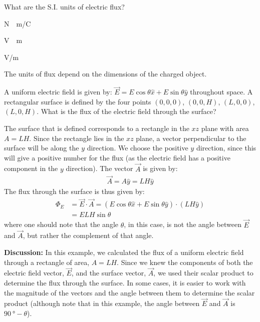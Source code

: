 \begin{checkpoint}\label{cp:gauss:unitsofflux}

	\begin{MCquestion}{What are the S.I. units of electric flux?}
		\item \si{N\cdot m/C}
		\item \si{V\cdot m} \correct
		\item \si{V/m}
		\item The units of flux depend on the dimensions of the charged object.
	\end{MCquestion}
\end{checkpoint}
\vspace{-0.25cm}
\begin{example}{A uniform electric field is given by: $\vec E=E\cos\theta\hat x+E\sin\theta\hat y $ throughout space. A rectangular surface is defined by the four points $(0,0,0)$, $(0,0,H)$, $(L,0,0)$, $(L,0,H)$. What is the flux of the electric field through the surface?}

The surface that is defined corresponds to a rectangle in the $xz$ plane with area $A=LH$. Since the rectangle lies in the $xz$ plane, a vector perpendicular to the surface will be along the $y$ direction. We choose the positive $y$ direction, since this will give a positive number for the flux (as the electric field has a positive component in the $y$ direction). The vector $\vec A$ is given by:
\begin{align*}
\vec A =A\hat y=LH\hat y
\end{align*}
The flux through the surface is thus given by:
\begin{align*}
\Phi_E&=\vec E\cdot \vec A=(E\cos\theta\hat x+E\sin\theta\hat y)\cdot(LH\hat y)\\
&=ELH\sin\theta
\end{align*}
where one should note that the angle $\theta$, in this case, is not the angle between $\vec E$ and $\vec A$, but rather the complement of that angle. 

\textbf{Discussion:} In this example, we calculated the flux of a uniform electric field through a rectangle of area, $A=LH$. Since we knew the components of both the electric field vector, $\vec E$, and the surface vector, $\vec A$, we used their scalar product to determine the flux through the surface. In some cases, it is easier to work with the magnitude of the vectors and the angle between them to determine the scalar product (although note that in this example, the angle between $\vec E$ and $\vec A$ is $\SI{90}{\degree}-\theta$).
\end{example}

